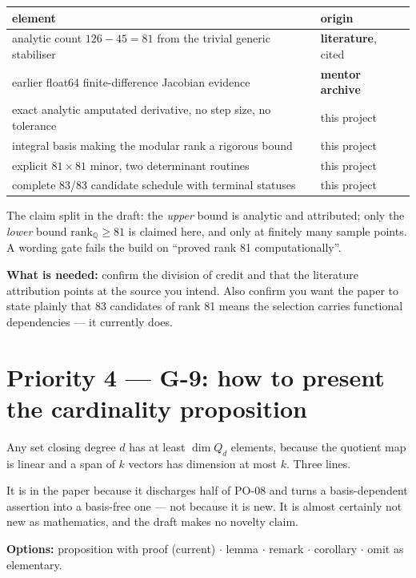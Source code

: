 \documentclass[11pt,a4paper]{article}
\begin{document}
\begin{center}
\begin{tabular}{ll}
\toprule
element & origin \\
\midrule
analytic count $126-45=81$ from the trivial generic stabiliser & \textbf{literature}, cited \\
earlier float64 finite-difference Jacobian evidence & \textbf{mentor archive} \\
exact analytic amputated derivative, no step size, no tolerance & this project \\
integral basis making the modular rank a rigorous bound & this project \\
explicit $81\times81$ minor, two determinant routines & this project \\
complete 83/83 candidate schedule with terminal statuses & this project \\
\bottomrule
\end{tabular}
\end{center}

The claim split in the draft: the \emph{upper} bound is analytic and attributed;
only the \emph{lower} bound $\mathrm{rank}_{\mathbb{Q}} \ge 81$ is claimed here,
and only at finitely many sample points. A wording gate fails the build on
``proved rank 81 computationally''.

\textbf{What is needed:} confirm the division of credit and that the literature
attribution points at the source you intend. Also confirm you want the paper to
state plainly that 83 candidates of rank 81 means the selection carries
functional dependencies --- it currently does.

\section*{Priority 4 --- G-9: how to present the cardinality proposition}

Any set closing degree $d$ has at least $\dim Q_d$ elements, because the quotient
map is linear and a span of $k$ vectors has dimension at most $k$. Three lines.

It is in the paper because it discharges half of PO-08 and turns a
basis-dependent assertion into a basis-free one --- not because it is new. It is
almost certainly not new as mathematics, and the draft makes no novelty claim.

\textbf{Options:} proposition with proof (current) $\cdot$ lemma $\cdot$ remark
$\cdot$ corollary $\cdot$ omit as elementary.
\end{document}
